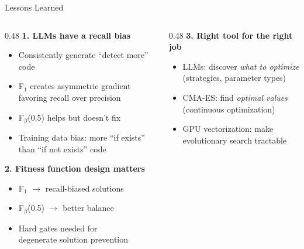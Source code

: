 \documentclass[aspectratio=169,12pt]{beamer}
\begin{document}
\begin{frame}{Lessons Learned}
  \begin{columns}[T]
    \begin{column}{0.48\textwidth}
      \textbf{1. LLMs have a recall bias}
      \begin{itemize}
        \item Consistently generate ``detect more'' code
        \item F$_1$ creates asymmetric gradient\\
              favoring recall over precision
        \item F$_\beta$(0.5) helps but doesn't fix
        \item Training data bias: more ``if exists''\\
              than ``if not exists'' code
      \end{itemize}

      \vspace{0.5em}
      \textbf{2. Fitness function design matters}
      \begin{itemize}
        \item F$_1$ $\to$ recall-biased solutions
        \item F$_\beta$(0.5) $\to$ better balance
        \item Hard gates needed for\\
              degenerate solution prevention
      \end{itemize}
    \end{column}
    \begin{column}{0.48\textwidth}
      \textbf{3. Right tool for the right job}
      \begin{itemize}
        \item LLMs: discover \emph{what to optimize}\\
              {\scriptsize (strategies, parameter types)}
        \item CMA-ES: find \emph{optimal values}\\
              {\scriptsize (continuous optimization)}
        \item GPU vectorization: make\\
              evolutionary search tractable
      \end{itemize}


\end{column}
\end{columns}
\end{frame}
\end{document}
